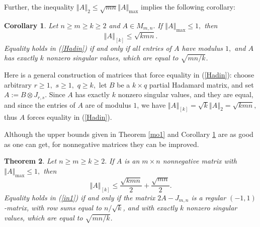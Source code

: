 \documentclass[12pt]{article}%
\newtheorem{theorem}{Theorem}[section]
\newtheorem{corollary}[theorem]{Corollary}
\begin{document}
Further, the inequality $\left\Vert A\right\Vert _{2}\leq\sqrt{mn}\left\Vert
A\right\Vert _{\max}$ implies the following corollary:

\begin{corollary}
\label{mo2}Let $n\geq m\geq k\geq2$ and $A\in M_{m,n}.$ If $\left\Vert
A\right\Vert _{\max}\leq1,$ then
\begin{equation}
\left\Vert A\right\Vert _{\left[  k\right]  }\leq\sqrt{kmn}. \label{Hadin}%
\end{equation}
Equality holds in (\ref{Hadin}) if and only if all entries of $A$ have modulus
$1,$ and $A$ has exactly $k$ nonzero singular values, which are equal to
$\sqrt{mn/k}$.
\end{corollary}

Here is a general construction of matrices that force equality in
(\ref{Hadin}): choose arbitrary $r\geq1,$ $s\geq1,$ $q\geq k,$ let $B$ be a
$k\times q$ partial Hadamard matrix, and set $A:=B\otimes J_{r,s}.$ Since $A$
has exactly $k$ nonzero singular values, and they are equal, and since the
entries of $A$ are of modulus $1$, we have $\left\Vert A\right\Vert _{\left[
k\right]  }=\sqrt{k}\left\Vert A\right\Vert _{2}=\sqrt{kmn},$ thus $A$ forces
equality in (\ref{Hadin}).\medskip

Although the upper bounds given in Theorem \ref{mo1} and Corollary \ref{mo2}
are as good as one can get, for nonnegative matrices they can be improved.

\begin{theorem}
\label{tNik}Let $n\geq m\geq k\geq2.$ If $A$ is an $m\times n$ nonnegative
matrix with $\left\Vert A\right\Vert _{\max}\leq1,$ then%
\begin{equation}
\left\Vert A\right\Vert _{\left[  k\right]  }\leq\frac{\sqrt{kmn}}{2}%
+\frac{\sqrt{mn}}{2}. \label{in1}%
\end{equation}
Equality holds in (\ref{in1}) if and only if the matrix $2A-J_{m,n}$ is a
regular $\left(  -1,1\right)  $-matrix, with row sums equal to $n/\sqrt{k}$,
and with exactly $k$ nonzero singular values, which are equal to $\sqrt{mn/k}$.
\end{theorem}
\end{document}
